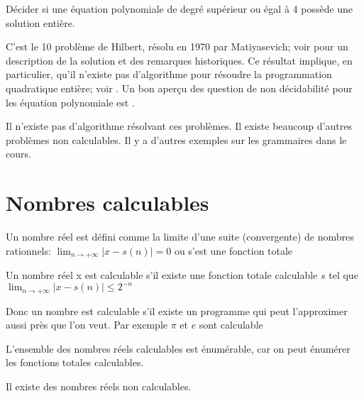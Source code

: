 \begin{mydef}
  Décider si une équation
  polynomiale de degré supérieur ou égal à 4 possède une solution entière.
\end{mydef}
C'est le 10\ieme{} problème de Hilbert, résolu en 1970 par Matiyasevich;
voir \cite{davis1973hilbert} pour un description de la solution et des remarques historiques.
Ce résultat implique, en particulier, qu'il n'existe pas d'algorithme pour résoudre
la programmation quadratique entière; voir \cite{jeroslow1973there}.
Un bon aperçu des question de non décidabilité pour les équation polynomiale est \cite{koenigsmann2014undecidability}.

Il n'existe pas d'algorithme résolvant ces problèmes. Il existe beaucoup
d'autres problèmes non calculables. Il y a d'autres exemples sur les grammaires dans le cours.

\section{Nombres calculables}
\label{sec:nombres_calculables}

\begin{mydef}
	Un nombre réel est défini comme la limite d'une suite (convergente) de
	nombres rationnels: $\lim_{n \rightarrow +\infty} |x-s(n)| = 0 $ ou s’est
	une fonction totale
\end{mydef}

\begin{mydef}
	Un nombre réel x est calculable s’il existe une fonction totale
	calculable $s$ tel que $\lim_{n \rightarrow +\infty} |x-s(n)| \leq 2^{-n}$
\end{mydef}

\begin{myrem}
	Donc un nombre est calculable s'il existe un programme qui peut
	l'approximer aussi près que l'on veut. Par exemple $\pi$ et $e$ sont
	calculable
\end{myrem}

\begin{myprop}
	L'ensemble des nombres réels calculables est énumérable, car on peut énumérer les
	fonctions totales calculables.
\end{myprop}

\begin{myprop}
	Il existe des nombres réels non calculables.
\end{myprop}

